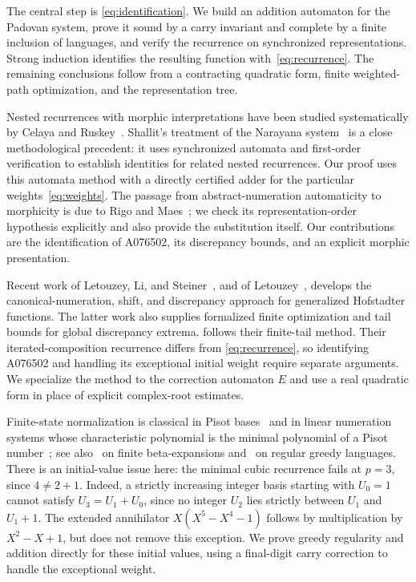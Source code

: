 \documentclass[11pt,a4paper]{article}
\numberwithin{equation}{section}
\theoremstyle{remark}
\begin{document}
The central step is \eqref{eq:identification}. We build an addition
automaton for the Padovan system, prove it sound by a carry invariant
and complete by a finite inclusion of languages, and verify the
recurrence on synchronized representations. Strong induction identifies the
resulting function with~\eqref{eq:recurrence}. The remaining conclusions
follow from a contracting quadratic form, finite weighted-path optimization,
and the representation tree.

Nested recurrences with morphic interpretations have been studied
systematically by Celaya and Ruskey~\cite{CR}. Shallit's treatment of the
Narayana system~\cite{Shallit} is a close methodological precedent: it uses
synchronized automata and first-order verification to establish identities
for related nested recurrences. Our proof uses this automata method with a
directly certified adder for the particular weights~\eqref{eq:weights}.
The passage from abstract-numeration automaticity to morphicity is due to
Rigo and Maes~\cite{RM}; we check its representation-order hypothesis
explicitly and also provide the substitution itself. Our contributions are
the identification of A076502, its discrepancy bounds, and an explicit
morphic presentation.

Recent work of Letouzey, Li, and Steiner~\cite{LLS}, and of
Letouzey~\cite{Letouzey}, develops the canonical-numeration, shift, and
discrepancy approach for generalized Hofstadter functions. The latter work
also supplies formalized finite optimization and tail bounds for global
discrepancy extrema.  follows their finite-tail method.
Their iterated-composition recurrence differs from
\eqref{eq:recurrence}, so identifying A076502 and handling its exceptional
initial weight require separate arguments. We specialize the method to
the correction automaton $E$ and use a real quadratic form in
place of explicit complex-root estimates.

Finite-state normalization is classical in Pisot bases~\cite{Frougny}
and in linear numeration systems whose characteristic polynomial is
the minimal polynomial of a Pisot number~\cite{FS96}; see also~\cite{FS}
on finite beta-expansions and~\cite{Hollander} on regular greedy languages.
There is an initial-value
issue here: the minimal cubic recurrence fails at $p=3$, since $4\ne2+1$.
Indeed, a strictly increasing integer basis starting with $U_0=1$ cannot
satisfy $U_3=U_1+U_0$, since no integer $U_2$ lies strictly between $U_1$
and $U_1+1$. The extended annihilator $X(X^5-X^4-1)$ follows by
multiplication by $X^2-X+1$, but does not remove this exception. We prove
greedy regularity and addition directly for these initial values, using a
final-digit carry correction to handle the exceptional weight.
\end{document}
